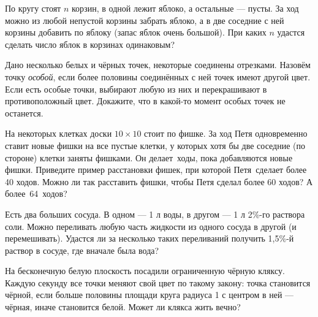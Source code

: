 \documentclass[a4paper,12pt]{article}
\begin{document}





По кругу стоят $n$ корзин, в одной %
лежит яблоко,
а остальные --- пусты. За ход %
можно из любой непустой
корзины забрать  %
яблоко, а в две соседние с ней корзины
добавить по яблоку (запас яблок очень большой).
При каких $n$ удастся %
сделать число яблок в корзинах одинаковым?


Дано несколько белых и чёрных точек, некоторые соединены отрезками.
Назовём точку {\em особой}, если более половины соединённых с ней точек %
имеют другой цвет.
Если есть особые точки, выбирают
любую из них и
перекрашивают в противоположный
цвет. %
Докажите, что %
в какой-то момент
особых точек не останется.


На некоторых клетках доски $10\times10$ стоит по фишке. За %
ход Петя
одновременно ставит новые фишки на все пустые клетки,
у которых хотя бы две соседние (по стороне) клетки заняты фишками.
Он делает~ходы, пока добавляются новые фишки. %
 Приведите пример расстановки фишек,
при которой Петя~сделает более 40 ходов.
 Можно ли так расставить
фишки, чтобы Петя сделал более 60 ходов?
 А более~64~ходов?

Есть два %
больших сосуда. В одном --- 1 л воды, в другом --- 1 л
2\%-го раствора соли. %
Можно переливать любую
часть жидкости из одного сосуда в другой (и перемешивать).
Удастся ли за несколько таких переливаний получить 1,5\%-й
раствор в сосуде, где вначале была вода?

\newpage


На бесконечную белую плоскость посадили ограниченную чёрную кляксу. Каждую секунду все точки меняют свой цвет по такому закону: точка становится чёрной, если больше половины площади круга радиуса 1 с центром в ней --- чёрная, иначе становится белой. Может ли клякса жить вечно?
\end{document}
